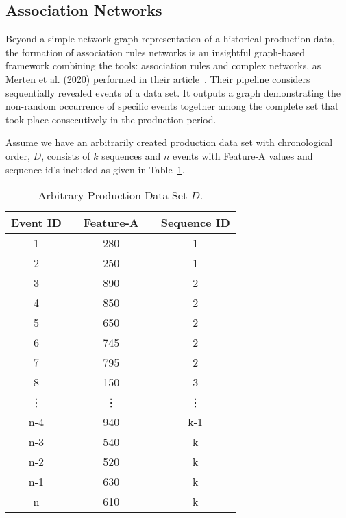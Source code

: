 \subsection{Association Networks}
Beyond a simple network graph representation of a historical production data, the formation of association rules networks is an insightful graph-based framework combining the tools: association rules and complex networks, as Merten et al. (2020) performed in their article~\cite{MERTEN2020}. Their pipeline considers sequentially revealed events of a data set. It outputs a graph demonstrating the non-random occurrence of specific events together among the complete set that took place consecutively in the production period.

Assume we have an arbitrarily created production data set with chronological order, $D$, consists of $k$ sequences and $n$ events with Feature-A values and sequence id's included as given in Table~\ref{Tab:D-dataset}.
\renewcommand{\arraystretch}{1.1}
\begin{table}[ht!]
	\centering
	\setlength{\arrayrulewidth}{0.79pt}%
	\caption{Arbitrary Production Data Set $D$.}
	\begin{tabular}{|c|ccc|c|}
		\hline \rowcolor[HTML]{FFFFC7}
		Event ID && Feature-A && Sequence ID   \\ \hline
		1 	      && 280  	&& 1 		   	  \\
		2 		  && 250	&& 1 		   	  \\
		3 	      && 890	&& 2 		      \\
		4 		  && 850	&& 2 		      \\
		5 	      && 650	&& 2   		      \\
		6 	      && 745	&& 2 		      \\
		7 		  && 795	&& 2 		      \\
		8 		  && 150	&& 3 		      \\
		\vdots	  && \vdots && \vdots 	      \\
		n-4 	  && 940  	&& k-1	 	      \\
		n-3 	  && 540  	&& k			  \\
		n-2 	  && 520	&& k 		      \\
		n-1       && 630	&& k 		      \\
		n 		  && 610	&& k 		      \\ \hline
	\end{tabular}
	\label{Tab:D-dataset}
\end{table}

